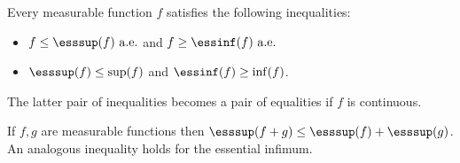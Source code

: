     \begin{property}
        Every measurable function $f$ satisfies the following inequalities:
        \begin{itemize}
            \item $f\leq\esssup(f)\text{ a.e.}$ and $f\geq\essinf(f)\text{ a.e.}$
            \item $\esssup(f)\leq\sup(f)$ and $\essinf(f)\geq\inf(f)$.
        \end{itemize}
        The latter pair of inequalities becomes a pair of equalities if $f$ is continuous.
    \end{property}
    \begin{property}
        If $f,g$ are measurable functions then $\esssup(f+g)\leq\esssup(f) + \esssup(g)$. An analogous inequality holds for the essential infimum.
    \end{property}
